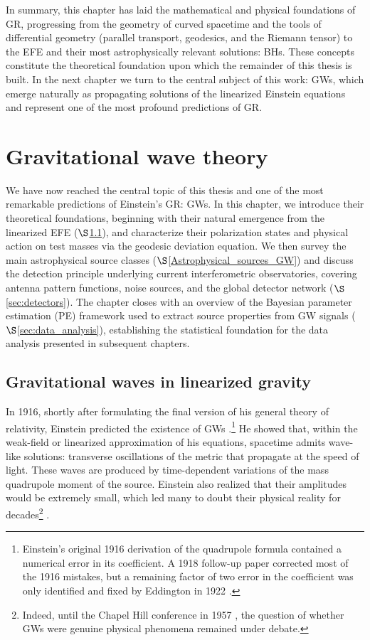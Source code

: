In summary, this chapter has laid the mathematical and physical foundations of GR, progressing from the geometry of curved spacetime and the tools of differential geometry (parallel transport, geodesics, and the Riemann tensor) to the EFE and their most astrophysically relevant solutions: BHs. These concepts constitute the theoretical foundation upon which the remainder of this thesis is built. In the next chapter we turn to the central subject of this work: GWs, which emerge naturally as propagating solutions of the linearized Einstein equations and represent one of the most profound predictions of GR.


\chapter{Gravitational wave theory}
\label{Gravitational wave theory}

We have now reached the central topic of this thesis and one of the most remarkable predictions of Einstein's GR: GWs. In this chapter, we introduce their theoretical foundations, beginning with their natural emergence from the linearized EFE ($\S$\ref{Gravitational_waves_linearized_gravity}), and characterize their polarization states and physical action on test masses via the geodesic deviation equation. We then survey the main astrophysical source classes ($\S$\ref{Astrophysical_sources_GW}) and discuss the detection principle underlying current interferometric observatories, covering antenna pattern functions, noise sources, and the global detector network ($\S$\ref{sec:detectors}). The chapter closes with an overview of the Bayesian parameter estimation (PE) framework used to extract source properties from GW signals ($\S$\ref{sec:data_analysis}), establishing the statistical foundation for the data analysis presented in subsequent chapters.

\section{Gravitational waves in linearized gravity}
\label{Gravitational_waves_linearized_gravity}


In 1916, shortly after formulating the final version of his general theory of relativity, Einstein predicted the existence of GWs \cite{Einstein1916GWpaper}.\footnote{Einstein's original 1916 derivation of the quadrupole formula contained a numerical error in its coefficient. A 1918 follow-up paper corrected most of the 1916 mistakes, but a remaining factor of two error in the coefficient was only identified and fixed by Eddington in 1922 \cite{Weinstein2016_Einstein_GW_history}.} He showed that, within the weak-field or linearized approximation of his equations, spacetime admits wave-like solutions: transverse oscillations of the metric that propagate at the speed of light. These waves are produced by time-dependent variations of the mass quadrupole moment of the source. Einstein also realized that their amplitudes would be extremely small, which led many to doubt their physical reality for decades\footnote{Indeed, until the Chapel Hill conference in 1957 \cite{Chapel_Hill_Conference}, the question of whether GWs were genuine physical phenomena remained under debate.} \cite{GW150914}. 

